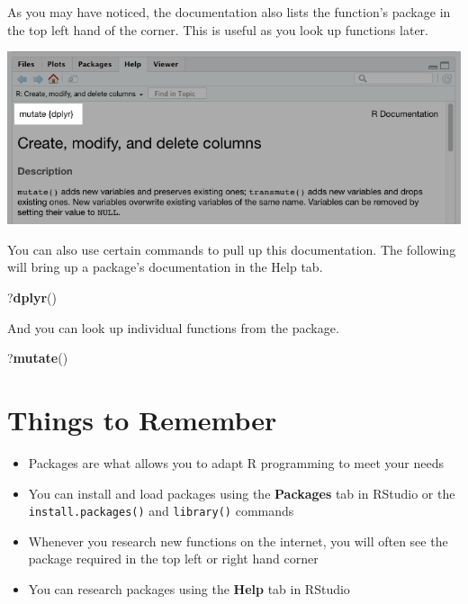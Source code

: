 \documentclass[
]{book}
\newenvironment{Shaded}{\begin{snugshade}}{\end{snugshade}}
\newcommand{\KeywordTok}[1]{\textcolor[rgb]{0.13,0.29,0.53}{\textbf{#1}}}
\newcommand{\NormalTok}[1]{#1}
\providecommand{\tightlist}{%
  \setlength{\itemsep}{0pt}\setlength{\parskip}{0pt}}
\begin{document}
\begin{center}
As you may have noticed, the documentation also lists the function's package in the top left hand of the corner. This is useful as you look up functions later.

\begin{center}\includegraphics[width=0.6\linewidth]{1.47_Package_Reference} \end{center}

You can also use certain commands to pull up this documentation. The following will bring up a package's documentation in the Help tab.

\begin{Shaded}
\begin{Highlighting}[]
\NormalTok{  ?}\KeywordTok{dplyr}\NormalTok{()}
\end{Highlighting}
\end{Shaded}

And you can look up individual functions from the package.

\begin{Shaded}
\begin{Highlighting}[]
\NormalTok{  ?}\KeywordTok{mutate}\NormalTok{()}
\end{Highlighting}
\end{Shaded}

\hypertarget{things-to-remember-5}{%
\section{Things to Remember}\label{things-to-remember-5}}

\begin{itemize}
\tightlist
\item
  Packages are what allows you to adapt R programming to meet your needs
\item
  You can install and load packages using the \textbf{Packages} tab in RStudio or the \texttt{install.packages()} and \texttt{library()} commands
\item
  Whenever you research new functions on the internet, you will often see the package required in the top left or right hand corner
\item
  You can research packages using the \textbf{Help} tab in RStudio
\end{itemize}


\end{center}
\end{document}
